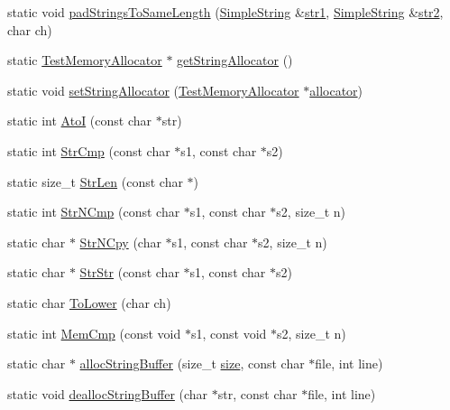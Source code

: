\begin{DoxyCompactItemize}
\item 
static void \hyperlink{class_simple_string_ae697cd1c14c5ca884666fefa6a3b3af4}{pad\+Strings\+To\+Same\+Length} (\hyperlink{class_simple_string}{Simple\+String} \&\hyperlink{_utest_platform_test_8cpp_a86966b7bcadcd1ff1be89e5868ebe2af}{str1}, \hyperlink{class_simple_string}{Simple\+String} \&\hyperlink{_utest_platform_test_8cpp_a78d75ebec545b3ddc9db50d2aba7688f}{str2}, char ch)
\item 
static \hyperlink{class_test_memory_allocator}{Test\+Memory\+Allocator} $\ast$ \hyperlink{class_simple_string_a26321ad812a6ba4e06b98cf958797b6f}{get\+String\+Allocator} ()
\item 
static void \hyperlink{class_simple_string_a0fc174ed352970a762b7648616916068}{set\+String\+Allocator} (\hyperlink{class_test_memory_allocator}{Test\+Memory\+Allocator} $\ast$\hyperlink{_memory_leak_warning_test_8cpp_a83fc2e9b9142613f7df2bcc3ff8292bc}{allocator})
\item 
static int \hyperlink{class_simple_string_a48b8491201bc1c032019324822db317e}{AtoI} (const char $\ast$str)
\item 
static int \hyperlink{class_simple_string_a0b7a8ae895cbde84a491b42c43de23a6}{Str\+Cmp} (const char $\ast$s1, const char $\ast$s2)
\item 
static size\+\_\+t \hyperlink{class_simple_string_a867ba0eaff866a8b87c33ece7e09a8fa}{Str\+Len} (const char $\ast$)
\item 
static int \hyperlink{class_simple_string_aa5c40b33a4812fdf30ee3e37e3f381b2}{Str\+N\+Cmp} (const char $\ast$s1, const char $\ast$s2, size\+\_\+t n)
\item 
static char $\ast$ \hyperlink{class_simple_string_a441975b120170a5cf9662de1330e2bf4}{Str\+N\+Cpy} (char $\ast$s1, const char $\ast$s2, size\+\_\+t n)
\item 
static char $\ast$ \hyperlink{class_simple_string_aa4de2381337817616753c064899f257d}{Str\+Str} (const char $\ast$s1, const char $\ast$s2)
\item 
static char \hyperlink{class_simple_string_a667501a50067ea0bc29309bd1d890676}{To\+Lower} (char ch)
\item 
static int \hyperlink{class_simple_string_ae43fb6d44bec574894191bf16b4096e7}{Mem\+Cmp} (const void $\ast$s1, const void $\ast$s2, size\+\_\+t n)
\item 
static char $\ast$ \hyperlink{class_simple_string_aa9edfa37772bc9395a55082d7d253590}{alloc\+String\+Buffer} (size\+\_\+t \hyperlink{class_simple_string_aac782da1f912bceb5d8ad00c8dc892ac}{size}, const char $\ast$file, int line)
\item 
static void \hyperlink{class_simple_string_adb1200ab6a2991aa2365c2f5adae4c06}{dealloc\+String\+Buffer} (char $\ast$str, const char $\ast$file, int line)
\end{DoxyCompactItemize}
